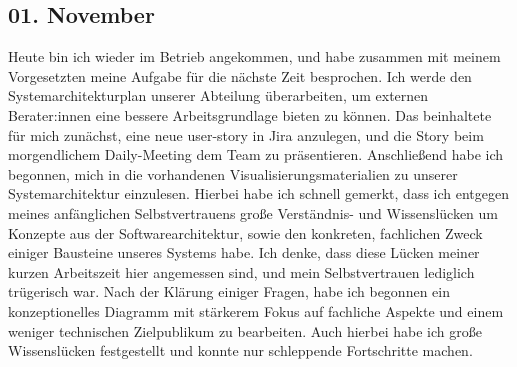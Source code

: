 \subsection{01. November}
Heute bin ich wieder im Betrieb angekommen, und habe zusammen mit meinem Vorgesetzten meine Aufgabe für die nächste Zeit besprochen. Ich werde den Systemarchitekturplan unserer Abteilung überarbeiten, um externen Berater:innen eine bessere Arbeitsgrundlage bieten zu können. Das beinhaltete für mich zunächst, eine neue user-story in Jira anzulegen, und die Story beim morgendlichem Daily-Meeting dem Team zu präsentieren. Anschließend habe ich begonnen, mich in die vorhandenen Visualisierungsmaterialien zu unserer Systemarchitektur einzulesen. Hierbei habe ich schnell gemerkt, dass ich entgegen meines anfänglichen Selbstvertrauens große Verständnis- und Wissenslücken um Konzepte aus der Softwarearchitektur, sowie den konkreten, fachlichen Zweck einiger Bausteine unseres Systems habe. Ich denke, dass diese Lücken meiner kurzen Arbeitszeit hier angemessen sind, und mein Selbstvertrauen lediglich trügerisch war. Nach der Klärung einiger Fragen, habe ich begonnen ein konzeptionelles Diagramm mit stärkerem Fokus auf fachliche Aspekte und einem weniger technischen Zielpublikum zu bearbeiten. Auch hierbei habe ich große Wissenslücken festgestellt und konnte nur schleppende Fortschritte machen.